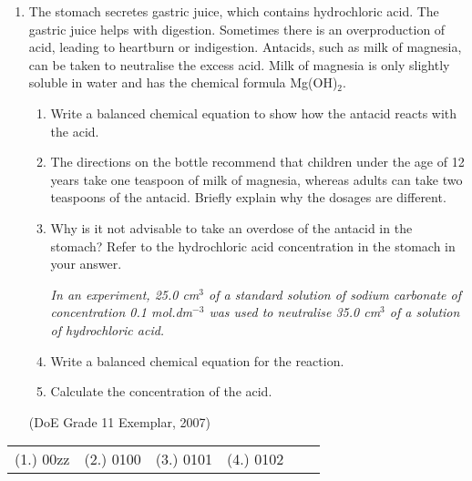 \begin{eocexercises}{}
\begin{enumerate}
\begin{enumerate}
(IEB Paper 2, 2005)

\item{
When chlorine water (Cl$_{2}$ dissolved in water) is added to a solution of potassium bromide, bromine is produced. Which one of the following statements concerning this reaction is correct?
\begin{enumerate}
\item{Br$^{-}$ is oxidised}
\item{Cl$_{2}$ is oxidised}
\item{Br$^{-}$ is the oxidising agent}
\item{Cl$^{-}$ is the oxidising agent}
\end{enumerate}
}
(IEB Paper 2, 2005)
\end{enumerate}
\renewcommand{\labelenumii}{\alph{enumii}}

\item{
The stomach secretes gastric juice, which contains hydrochloric acid. The gastric juice helps with digestion. Sometimes there is an overproduction of acid, leading to heartburn or indigestion. Antacids, such as milk of magnesia, can be taken to neutralise the excess acid. Milk of magnesia is only slightly soluble in water and has the chemical formula Mg(OH)$_{2}$.
\begin{enumerate}
\item{Write a balanced chemical equation to show how the antacid reacts with the acid.}
\item{The directions on the bottle recommend that children under the age of 12 years take one teaspoon of milk of magnesia, whereas adults can take two teaspoons of the antacid. Briefly explain why the dosages are different.}
\item{Why is it not advisable to take an overdose of the antacid in the stomach? Refer to the hydrochloric acid concentration in the stomach in your answer.}

\textit{In an experiment, 25.0 cm$^{3}$ of a standard solution of sodium carbonate of concentration 0.1 mol.dm$^{-3}$ was used to neutralise 35.0 cm$^{3}$ of a solution of hydrochloric acid.}

\item{Write a balanced chemical equation for the reaction.}
\item{Calculate the concentration of the acid.}
\end{enumerate}
}
(DoE Grade 11 Exemplar, 2007)
\end{enumerate}

\practiceinfo

\begin{tabular}[h]{cccccc}
(1.) 00zz & (2.) 0100 & (3.) 0101 & (4.) 0102 & 
 \end{tabular}
\end{eocexercises}










